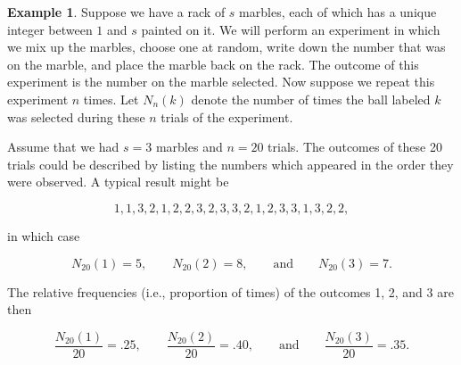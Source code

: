 \documentclass{article}
\theoremstyle{definition}
\theoremstyle{remark}
\theoremstyle{definition}
\newtheorem{example}{Example}[section]
\begin{document}
\begin{example}
    Suppose we have a rack of $s$ marbles, each of which has a unique integer between $1$ and $s$ painted on it. We will perform an experiment in which we mix up the marbles, choose one at random, write down the number that was on the marble, and place the marble back on the rack. The outcome of this experiment is the number on the marble selected. Now suppose we repeat this experiment $n$ times. Let $N_n(k)$ denote the number of times the ball labeled $k$ was selected during these $n$ trials of the experiment.\par Assume that we had $s=3$ marbles and $n=20$ trials. The outcomes of these 20 trials could be described by listing the numbers which appeared in the order they were observed. A typical result might be 
    
    \begin{equation*}
        1,1,3,2,1,2,2,3,2,3,3,2,1,2,3,3,1,3,2,2,
    \end{equation*}
    
    \noindent in which case 
    
    \begin{equation*}
        N_{20}(1)=5,\quad\quad N_{20}(2)=8, \quad\quad \text{and} \quad\quad N_{20}(3)=7.
    \end{equation*}
    
    \noindent The relative frequencies (i.e., proportion of times) of the outcomes 1, 2, and 3 are then 
    
    \begin{equation*}
        \frac{N_{20}(1)}{20}=.25, \quad\quad \frac{N_{20}(2)}{20}=.40, \quad\quad \text{and} \quad\quad \frac{N_{20}(3)}{20}=.35.
    \end{equation*}
    

\end{example}
\end{document}
